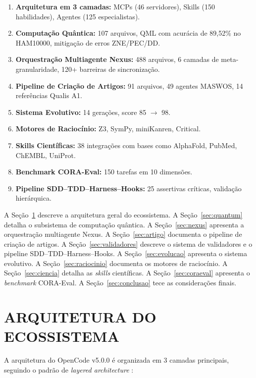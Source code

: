 \documentclass[
  brazil,
  sumario=tradicional,
  10pt
]{abntex2}
\begin{document}
\begin{enumerate}
  \item \textbf{Arquitetura em 3 camadas:} MCPs (46 servidores),
    Skills (150 habilidades), Agentes (125 especialistas).
  \item \textbf{Computação Quântica:} 107 arquivos, QML com acurácia
    de 89,52\% no HAM10000, mitigação de erros ZNE/PEC/DD.
  \item \textbf{Orquestração Multiagente Nexus:} 488 arquivos,
    6 camadas de meta-granularidade, 120+ barreiras de sincronização.
  \item \textbf{Pipeline de Criação de Artigos:} 91 arquivos,
    49 agentes MASWOS, 14 referências Qualis A1.
  \item \textbf{Sistema Evolutivo:} 14 gerações, score 85 $\rightarrow$ 98.
  \item \textbf{Motores de Raciocínio:} Z3, SymPy, miniKanren, Critical.
  \item \textbf{Skills Científicas:} 38 integrações com bases como
    AlphaFold, PubMed, ChEMBL, UniProt.
  \item \textbf{Benchmark CORA-Eval:} 150 tarefas em 10 dimensões.
  \item \textbf{Pipeline SDD--TDD--Harness--Hooks:} 25 assertivas
    críticas, validação hierárquica.
\end{enumerate}

A Seção~\ref{sec:arquitetura} descreve a arquitetura geral do ecossistema.
A Seção~\ref{sec:quantum} detalha o subsistema de computação quântica.
A Seção~\ref{sec:nexus} apresenta a orquestração multiagente Nexus.
A Seção~\ref{sec:artigo} documenta o pipeline de criação de artigos.
A Seção~\ref{sec:validadores} descreve o sistema de validadores e o
pipeline SDD--TDD--Harness--Hooks. A Seção~\ref{sec:evolucao} apresenta
o sistema evolutivo. A Seção~\ref{sec:raciocinio} documenta os motores
de raciocínio. A Seção~\ref{sec:ciencia} detalha as \textit{skills}
científicas. A Seção~\ref{sec:coraeval} apresenta o \textit{benchmark}
CORA-Eval. A Seção~\ref{sec:conclusao} tece as considerações finais.

\section{ARQUITETURA DO ECOSSISTEMA}
\label{sec:arquitetura}

A arquitetura do OpenCode v5.0.0 é organizada em 3 camadas principais,
seguindo o padrão de \textit{layered architecture}
\cite{martin2017clean}:
\end{document}

